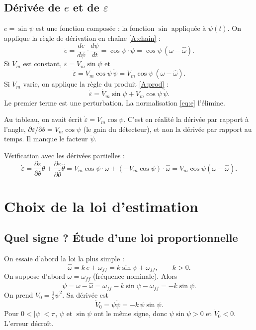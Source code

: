 \documentclass[11pt,a4paper]{article}
\numberwithin{equation}{section}
\theoremstyle{plain}
\theoremstyle{definition}
\theoremstyle{remark}
\newcommand{\hth}{\hat{\theta}}
\newcommand{\hw}{\hat{\omega}}
\newcommand{\wff}{\omega_{ff}}
\begin{document}
\subsection{Dérivée de $e$ et de $\varepsilon$}\label{sec:edot}
$e=\sin\psi$ est une fonction composée : la fonction $\sin$ appliquée à $\psi(t)$.
On applique la règle de dérivation en chaîne \eqref{A:chain} :
\begin{equation}
\dot e = \frac{de}{d\psi}\cdot\frac{d\psi}{dt} = \cos\psi\cdot\dot\psi = \cos\psi\,(\omega-\hw).
\end{equation}
Si $V_m$ est constant, $\varepsilon = V_m\sin\psi$ et
\begin{equation}
\dot\varepsilon = V_m\cos\psi\,\dot\psi = V_m\cos\psi\,(\omega-\hw).
\end{equation}
Si $V_m$ varie, on applique la règle du produit \eqref{A:prod} :
\begin{equation}
\dot\varepsilon = \dot V_m\sin\psi + V_m\cos\psi\,\dot\psi .
\end{equation}
Le premier terme est une perturbation. La normalisation \eqref{eq:e} l'élimine.

\begin{attention}
Au tableau, on avait écrit $\dot\varepsilon = V_m\cos\psi$. C'est en réalité la dérivée par rapport
à l'angle, $\partial\varepsilon/\partial\theta = V_m\cos\psi$ (le gain du détecteur), et non la dérivée
par rapport au temps. Il manque le facteur $\dot\psi$.

Vérification avec les dérivées partielles :
\[
\dot\varepsilon = \frac{\partial\varepsilon}{\partial\theta}\dot\theta + \frac{\partial\varepsilon}{\partial\hth}\dot\hth
= V_m\cos\psi\cdot\omega + (-V_m\cos\psi)\cdot\hw = V_m\cos\psi(\omega-\hw).
\]
\end{attention}

\section{Choix de la loi d'estimation}

\subsection{Quel signe ? Étude d'une loi proportionnelle}\label{sec:signe}
On essaie d'abord la loi la plus simple :
\begin{equation}
\hw = k\,e + \wff = k\sin\psi + \wff,\qquad k>0 .
\end{equation}
On suppose d'abord $\omega=\wff$ (fréquence nominale). Alors
\begin{equation}
\dot\psi = \omega-\hw = \wff - k\sin\psi - \wff = -k\sin\psi .
\end{equation}
On prend $V_0=\frac12\psi^2$. Sa dérivée est
\begin{equation}
\dot V_0 = \psi\dot\psi = -k\,\psi\sin\psi .
\end{equation}
Pour $0<|\psi|<\pi$, $\psi$ et $\sin\psi$ ont le même signe, donc $\psi\sin\psi>0$ et $\dot V_0<0$.
L'erreur décroît.
\end{document}
